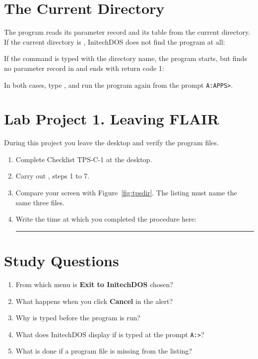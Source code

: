 \section{The Current Directory}
The program reads its parameter record and its table from the current
directory.  If the current directory is , InitechDOS does not
find the program at all:


If the command is typed with the directory name, the program starts, but
finds no parameter record in  and ends with return code 1:


In both cases, type , and run the program again from the
prompt \texttt{A:\bs APPS>}.

\section{Lab Project 1. Leaving FLAIR}
During this project you leave the desktop and verify the program files.
\begin{enumerate}
\item Complete Checklist TPS-C-1 at the desktop.
\item Carry out , steps 1 to 7.
\item Compare your screen with Figure~\ref{fig:tpsdir}.  The listing
  must name the same three files.
\item Write the time at which you completed the procedure here:
  \rule{30mm}{0.4pt}
\end{enumerate}

\section{Study Questions}
\begin{enumerate}
\item From which menu is \textbf{Exit to InitechDOS} chosen?
\item What happens when you click \textbf{Cancel} in the alert?
\item Why is  typed before the program is run?
\item What does InitechDOS display if  is typed at the
  prompt \texttt{A:\bs>}?
\item What is done if a program file is missing from the listing?
\end{enumerate}
